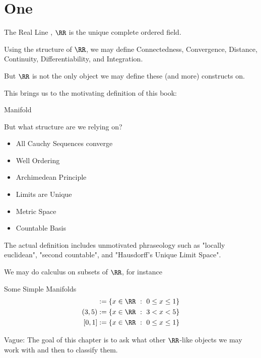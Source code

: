 \chapter*{One}

The Real Line , \( \RR \) is the unique complete ordered field.

Using the structure of \( \RR \),
    we may define Connectedness, Convergence, Distance, Continuity, Differentiability, and Integration.

But \( \RR \) is not the only object we may define these (and more) constructs on.

This brings us to the motivating definition of this book:
\begin{boxIntuition}{Manifold}
\begin{boxTODO}{}
\end{boxTODO}

But what structure are we relying on?
\begin{itemize}
    \item All Cauchy Sequences converge
    \item Well Ordering
    \item Archimedean Principle
    \item Limits are Unique
    \item Metric Space
    \item Countable Basis
\end{itemize}

The actual definition includes unmotivated phraseology such as "locally euclidean", "second countable", and "Hausdorff's Unique Limit Space".
\end{boxIntuition}
We may do calculus on subsets of \( \RR \), for instance 
\begin{boxExample}{Some Simple Manifolds}
\begin{align*} 
    [0, 1] &:= \{ x \in \RR\ :\ 0 \leq x \leq 1 \}\\
    (3, 5) &:= \{ x \in \RR\ :\ 3 < x < 5 \}\\
    [0, 1] &:= \{ x \in \RR\ :\ 0 \leq x \leq 1 \}\\
\end{align*}
\end{boxExample}


\begin{boxTODO}{}
Vague:
The goal of this chapter is to ask what other \( \RR \)-like objects we may work with
    and then to classify them.
\end{boxTODO}


